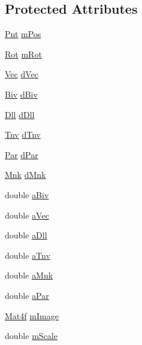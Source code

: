 \subsection*{Protected Attributes}
\begin{DoxyCompactItemize}
\item 
\hyperlink{namespacevsr_a2d05beb9721c5d9211b479af6d47222d}{Pnt} \hyperlink{classvsr_1_1_frame_a85c31a1ec08d5e446f0d4ec86e182910}{m\-Pos}
\item 
\hyperlink{namespacevsr_aa1af5d33b552dd31499209a8f68548e8}{Rot} \hyperlink{classvsr_1_1_frame_a4c88683dae16cc51985eac1f2cbf6864}{m\-Rot}
\item 
\hyperlink{namespacevsr_a0d061c30ac198a710a1b92dd8b343273}{Vec} \hyperlink{classvsr_1_1_frame_ad42f1e4d6c5f4f6a9b50c0f59713aa99}{d\-Vec}
\item 
\hyperlink{namespacevsr_ab2f5aee828c6c805b8a86a5b077d192c}{Biv} \hyperlink{classvsr_1_1_frame_a9195adebb17ba0ad84ba7849850f1578}{d\-Biv}
\item 
\hyperlink{namespacevsr_a6c6892b7aec25cfb16492501e2e35b11}{Dll} \hyperlink{classvsr_1_1_frame_ada205fc37ee27b1bd32e65f981560b20}{d\-Dll}
\item 
\hyperlink{namespacevsr_a042664cb2545c7ef14aeb5e5e5d092de}{Tnv} \hyperlink{classvsr_1_1_frame_aa207ba6af083c439b431028aa9f37524}{d\-Tnv}
\item 
\hyperlink{namespacevsr_ae046793ece205351429a6346a66fd6eb}{Par} \hyperlink{classvsr_1_1_frame_a7431a1d5353c31e91ecb6b4f3b5a0971}{d\-Par}
\item 
\hyperlink{namespacevsr_ace9d2714a493810090e61420d6a688c6}{Mnk} \hyperlink{classvsr_1_1_frame_ac6b5bd3194360ef2a0391236e5fcf893}{d\-Mnk}
\item 
double \hyperlink{classvsr_1_1_frame_ac035f6b132b6c6d4e9e4233dc0ac7d39}{a\-Biv}
\item 
double \hyperlink{classvsr_1_1_frame_ac4f90219600fb31b03d157e6e60af411}{a\-Vec}
\item 
double \hyperlink{classvsr_1_1_frame_ad774ea1636169daed48c3de08090ab28}{a\-Dll}
\item 
double \hyperlink{classvsr_1_1_frame_a95e70c04818aac6e1c01109f6d8c29a9}{a\-Tnv}
\item 
double \hyperlink{classvsr_1_1_frame_a158e0b963f7bf68573b3a7153a6ed596}{a\-Mnk}
\item 
double \hyperlink{classvsr_1_1_frame_a9ee8067c502dacd6d134081cbf0585f1}{a\-Par}
\item 
\hyperlink{classvsr_1_1_mat4}{Mat4f} \hyperlink{classvsr_1_1_frame_a4f1d124a66bf0d62e3a1794776368a8d}{m\-Image}
\item 
double \hyperlink{classvsr_1_1_frame_aba7250cb48e33717a4244aa2c8bc86bf}{m\-Scale}
\end{DoxyCompactItemize}


